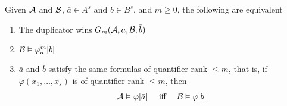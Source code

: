 \documentclass[11pt]{article}
\begin{document}
\begin{theorem}
\label{thm2.2.8}
Given \(\mathcal{A}\) and \(\mathcal{B}\), \(\bar{a}\in A^s\) and \(\bar{b}\in B^s\), and \(m\ge0\), the
following are equivalent
\begin{enumerate}
\item The duplicator wins \(G_m(\mathcal{A},\bar{a},\mathcal{B},\bar{b})\)
\item \(\mathcal{B}\vDash\varphi_{\bar{a}}^m[\bar{b}]\)
\item \(\bar{a}\) and \(\bar{b}\) satisfy the same formulas of quantifier rank \(\le m\), that is,
if \(\varphi(x_1,\dots,x_s)\) is of quantifier rank \(\le m\), then
\begin{equation}
\label{eq:2.2.8}
\mathcal{A}\vDash\varphi[\bar{a}] \quad\text{ iff }\quad
\mathcal{B}\vDash\varphi[\bar{b}]
\end{equation}
\end{enumerate}
\end{theorem}
\end{document}
